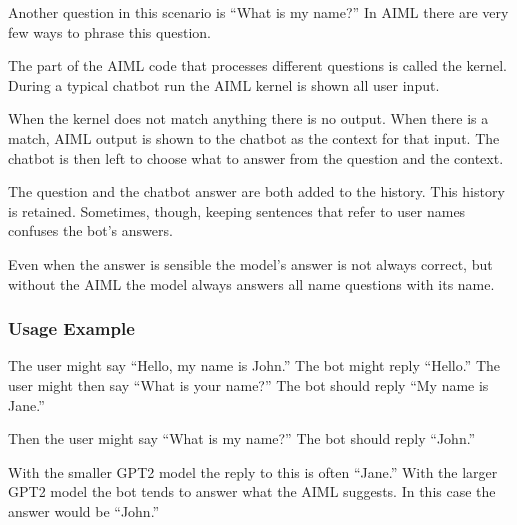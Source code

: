 Another question in this scenario is ``What is my name?'' In AIML there are very few ways to phrase this question. %

The part of the AIML code that processes different questions is called the kernel.
During a typical chatbot run the AIML kernel is shown all user input.%

When the kernel does not match anything there is no output. When there is a match, AIML output is shown to the chatbot as the context for that input. 
The chatbot is then left to choose what to answer from the question and the context. 

The question and the chatbot answer are both added to the history. 
This history is retained. 
Sometimes, though, keeping sentences that refer to user names confuses the bot's answers.%

Even when the answer is sensible the model's answer is not always correct, but without the AIML the model always answers all name questions with its name. 


\subsubsection{Usage Example}

The user might say ``Hello, my name is John.'' The bot might reply ``Hello.'' The user might then say ``What is your name?'' The bot should reply ``My name is Jane.''

Then the user might say ``What is my name?'' The bot should reply ``John.''

With the smaller GPT2 model the reply to this is often ``Jane.'' %
With the larger GPT2 model the bot tends to answer what the AIML suggests. In this case the answer would be ``John.''

